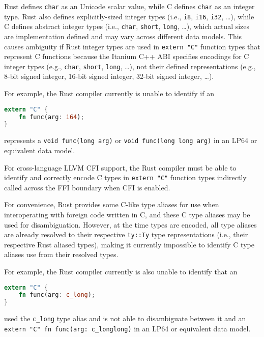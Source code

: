 \documentclass{article}
\begin{document}
Rust defines \texttt{char} as an Unicode scalar value, while C defines \texttt{char} as an integer type. Rust also defines explicitly-sized integer types (i.e., \texttt{i8}, \texttt{i16}, \texttt{i32}, …), while C defines abstract integer types (i.e., \texttt{char}, \texttt{short}, \texttt{long}, …), which actual sizes are implementation defined and may vary across different data models. This causes ambiguity if Rust integer types are used in \texttt{extern "C"} function types that represent C functions because the Itanium C++ ABI specifies encodings for C integer types (e.g., \texttt{char}, \texttt{short}, \texttt{long}, …), not their defined representations (e.g., 8-bit signed integer, 16-bit signed integer, 32-bit signed integer, …).

For example, the Rust compiler currently is unable to identify if an

\begin{lstlisting}[language=Rust, caption={Example extern "C" function using Rust integer type.}]
extern "C" {
    fn func(arg: i64);
}
\end{lstlisting}

represents a \texttt{void func(long arg)} or \texttt{void func(long long arg)} in an LP64 or equivalent data model.

For cross-language LLVM CFI support, the Rust compiler must be able to identify and correctly encode C types in \texttt{extern "C"} function types indirectly called across the FFI boundary when CFI is enabled.

For convenience, Rust provides some C-like type aliases for use when interoperating with foreign code written in C, and these C type aliases may be used for disambiguation. However, at the time types are encoded, all type aliases are already resolved to their respective \texttt{ty::Ty} type representations (i.e., their respective Rust aliased types), making it currently impossible to identify C type aliases use from their resolved types.

For example, the Rust compiler currently is also unable to identify that an

\begin{lstlisting}[language=Rust, caption={Example extern "C" function using C type alias.}]
extern "C" {
    fn func(arg: c_long);
}
\end{lstlisting}

used the \texttt{c\_long} type alias and is not able to disambiguate between it and an \texttt{extern "C" fn func(arg: c\_longlong)} in an LP64 or equivalent data model.
\end{document}
